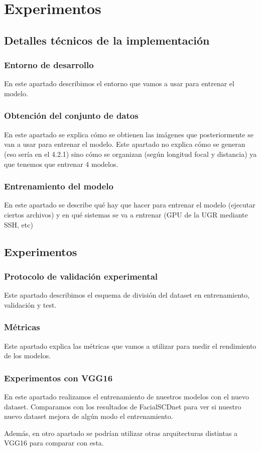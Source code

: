 \chapter{Experimentos}
\thispagestyle{empty}

\section{Detalles técnicos de la implementación}

\subsection{Entorno de desarrollo}
En este apartado describimos el entorno que vamos a usar para entrenar el modelo.

\subsection{Obtención del conjunto de datos}
En este apartado se explica cómo se obtienen las imágenes que posteriormente se van a usar para entrenar el modelo. Este apartado no explica cómo se generan (eso sería en el 4.2.1) sino cómo se organizan (según longitud focal y distancia) ya que tenemos que entrenar 4 modelos.

\subsection{Entrenamiento del modelo}
En este apartado se describe qué hay que hacer para entrenar el modelo (ejecutar ciertos archivos) y en qué sistemas se va a entrenar (GPU de la UGR mediante SSH, etc)


\section{Experimentos}

\subsection{Protocolo de validación experimental}
Este apartado describimos el esquema de división del dataset en entrenamiento, validación y test.

\subsection{Métricas}
Este apartado explica las métricas que vamos a utilizar para medir el rendimiento de los modelos.

\subsection{Experimentos con VGG16}
En este apartado realizamos el entrenamiento de nuestros modelos con el nuevo dataset. Comparamos con los resultados de FacialSCDnet para ver si nuestro nuevo dataset mejora de algún modo el entrenamiento.

Además, en otro apartado se podrían utilizar otras arquitecturas distintas a VGG16 para comparar con esta.